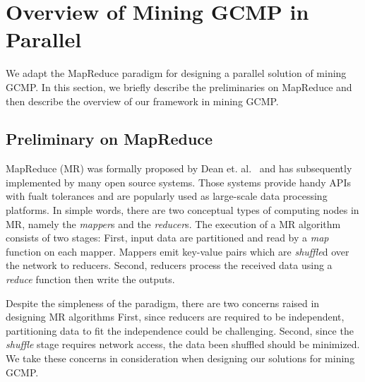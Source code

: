 \section{Overview of Mining GCMP in Parallel}
\label{sec:system_overview}
We adapt the MapReduce paradigm for designing
a parallel solution of mining GCMP. In this section,
we briefly describe the preliminaries on MapReduce and then describe
the overview of our framework in mining GCMP.

\subsection{Preliminary on MapReduce}
MapReduce (MR) was formally proposed by Dean et. al.~\cite{dean2008mapreduce}
and has subsequently implemented by many open source systems. Those systems
provide handy APIs with fualt tolerances and are popularly
used as large-scale data processing platforms. 
In simple words, there are two conceptual types of computing nodes in MR,
namely the \emph{mapper}s and the \emph{reducer}s. The execution of a MR 
algorithm consists of two stages: First, input data
are partitioned and read by a \emph{map} function on each mapper. Mappers
emit key-value pairs which are \emph{shuffle}d over the network to reducers. Second,
reducers process the received data using a \emph{reduce} function then write the
outputs. 

Despite the simpleness of the paradigm, there are two concerns raised in designing MR algorithms
First, since reducers are required to be independent, partitioning  
data to fit the independence could be challenging. Second, since the \emph{shuffle}
stage requires network access, the data been shuffled should be minimized. 
We take these concerns in consideration when designing our solutions for mining GCMP.
%
%

